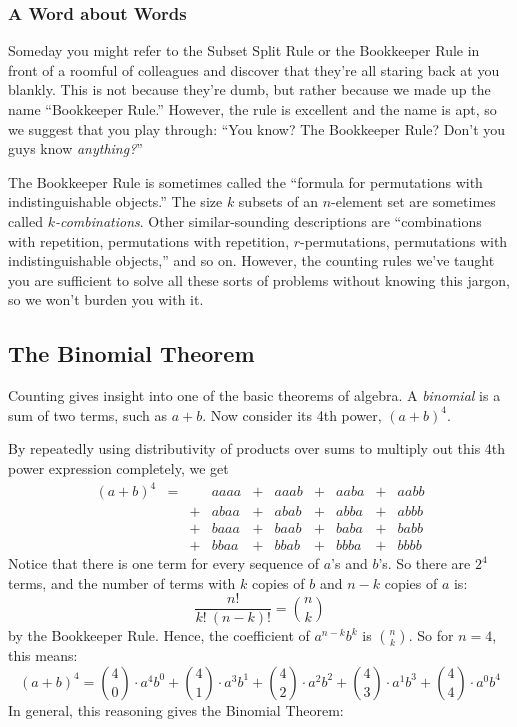 \subsubsection{A Word about Words}

Someday you might refer to the Subset Split Rule or the Bookkeeper Rule
in front of a roomful of colleagues and discover that they're all staring
back at you blankly.  This is not because they're dumb, but rather because
we made up the name ``Bookkeeper Rule.''  However, the rule is excellent
and the name is apt, so we suggest that you play through: ``You know?  The
Bookkeeper Rule?  Don't you guys know \emph{anything?}''

The Bookkeeper Rule is sometimes called the ``formula for permutations
with indistinguishable objects.''  The size $k$ subsets of an $n$-element
set are sometimes called%
\emph{$k$-combinations}.  Other similar-sounding
descriptions are ``combinations with repetition, permutations with
repetition, $r$-permutations, permutations with indistinguishable
objects,'' and so on.  However, the counting rules we've taught you are
sufficient to solve all these sorts of problems without knowing this
jargon, so we won't burden you with it.

\begin{problems}
\classproblems
{}
\end{problems}


\subsection{The Binomial Theorem}\label{binomial_theorem_sec}

Counting gives insight into one of the basic theorems of algebra.  A
\emph{binomial}%
 is a sum of two terms, such as $a + b$.  Now consider its
4th power, $(a + b)^4$.

By repeatedly using distributivity of products over sums to multiply
out this 4th power expression completely, we get
\[\begin{array}{rccccccccc}
(a + b)^4
   & = &    & aaaa & + & aaab & + & aaba & + & aabb \\
   &   &  + & abaa & + & abab & + & abba & + & abbb \\
   &   &  + & baaa & + & baab & + & baba & + & babb \\
   &   &  + & bbaa & + & bbab & + & bbba & + & bbbb
\end{array}\]
Notice that there is one term for every sequence of $a$'s and $b$'s.  So
there are $2^4$ terms, and the number of terms with $k$ copies of $b$ and
$n - k$ copies of $a$ is:
\[
\frac{n!}{k!\ (n-k)!} = \binom{n}{k}
\]
by the Bookkeeper Rule.  Hence, the coefficient of $a^{n-k} b^k$ is
$\binom{n}{k}$.  So for $n = 4$, this means:
\[
(a + b)^4 =
    \binom{4}{0} \cdot a^4 b^0 +
    \binom{4}{1} \cdot a^3 b^1 +
    \binom{4}{2} \cdot a^2 b^2 +
    \binom{4}{3} \cdot a^1 b^3 +
    \binom{4}{4} \cdot a^0 b^4
\]
In general, this reasoning gives the Binomial Theorem:

